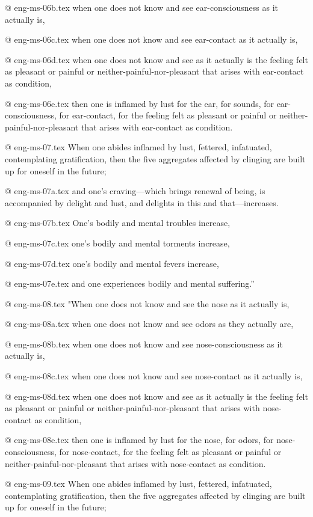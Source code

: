 @ eng-ms-06b.tex
when one does not know and see ear-consciousness as it actually is,

@ eng-ms-06c.tex
when one does not know and see ear-contact as it actually is,

@ eng-ms-06d.tex
when one does not know and see as it actually is the feeling felt as pleasant or painful or neither-painful-nor-pleasant that arises with ear-contact as condition,

@ eng-ms-06e.tex
then one is inflamed by lust for the ear, for sounds, for ear-consciousness, for ear-contact, for the feeling felt as pleasant or painful or neither-painful-nor-pleasant that arises with ear-contact as condition.

@ eng-ms-07.tex
When one abides inflamed by lust, fettered, infatuated, contemplating gratification, then the five aggregates affected by clinging are built up for oneself in the future;

@ eng-ms-07a.tex
and one’s craving—which brings renewal of being, is accompanied by delight and lust, and delights in this and that—increases.

@ eng-ms-07b.tex
One’s bodily and mental troubles increase,

@ eng-ms-07c.tex
one’s bodily and mental torments increase,

@ eng-ms-07d.tex
one’s bodily and mental fevers increase,

@ eng-ms-07e.tex
and one experiences bodily and mental suffering.”

@ eng-ms-08.tex
"When one does not know and see the nose as it actually is,

@ eng-ms-08a.tex
when one does not know and see odors as they actually are,

@ eng-ms-08b.tex
when one does not know and see nose-consciousness as it actually is,

@ eng-ms-08c.tex
when one does not know and see nose-contact as it actually is,

@ eng-ms-08d.tex
when one does not know and see as it actually is the feeling felt as pleasant or painful or neither-painful-nor-pleasant that arises with nose-contact as condition,

@ eng-ms-08e.tex
then one is inflamed by lust for the nose, for odors, for nose-consciousness, for nose-contact, for the feeling felt as pleasant or painful or neither-painful-nor-pleasant that arises with nose-contact as condition.

@ eng-ms-09.tex
When one abides inflamed by lust, fettered, infatuated, contemplating gratification, then the five aggregates affected by clinging are built up for oneself in the future;

